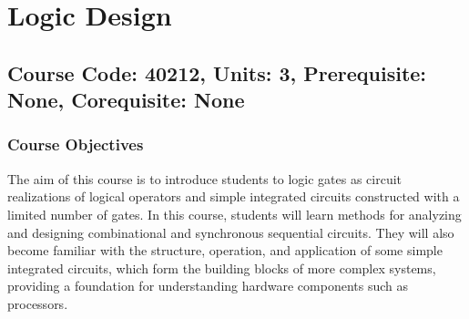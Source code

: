 \documentclass[12pt]{article}
\begin{document}
\newpage

\section{Logic Design}
\subsection*{Course Code: 40212, Units: 3, Prerequisite: None, Corequisite: None}

\subsubsection*{Course Objectives}
The aim of this course is to introduce students to logic gates as circuit realizations of logical operators and simple integrated circuits constructed with a limited number of gates. In this course, students will learn methods for analyzing and designing combinational and synchronous sequential circuits. They will also become familiar with the structure, operation, and application of some simple integrated circuits, which form the building blocks of more complex systems, providing a foundation for understanding hardware components such as processors.
\end{document}
